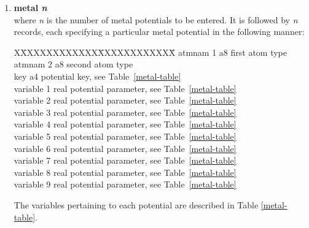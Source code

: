 \begin{enumerate}
\item {\bf metal {\em n}} \\
where {\em n} is the number of metal potentials to be entered.  It
is followed by {\em n} records, each specifying a particular metal
potential in the following manner:
\begin{tabbing}
X\=XXXXXXXXXXXX\=XXXXXXXXXXXX\=\kill
\> atmnam 1     \> a8   \> first atom type \\
\> atmnam 2     \> a8   \> second atom type \\
\> key          \> a4   \> potential key, see Table~\ref{metal-table} \\
\> variable 1   \> real \> potential parameter, see Table~\ref{metal-table} \\
\> variable 2   \> real \> potential parameter, see Table~\ref{metal-table} \\
\> variable 3   \> real \> potential parameter, see Table~\ref{metal-table} \\
\> variable 4   \> real \> potential parameter, see Table~\ref{metal-table} \\
\> variable 5   \> real \> potential parameter, see Table~\ref{metal-table} \\
\> variable 6   \> real \> potential parameter, see Table~\ref{metal-table} \\
\> variable 7   \> real \> potential parameter, see Table~\ref{metal-table} \\
\> variable 8   \> real \> potential parameter, see Table~\ref{metal-table} \\
\> variable 9   \> real \> potential parameter, see Table~\ref{metal-table}
\end{tabbing}
The variables pertaining to each potential are described in Table
\ref{metal-table}.


\end{enumerate}
